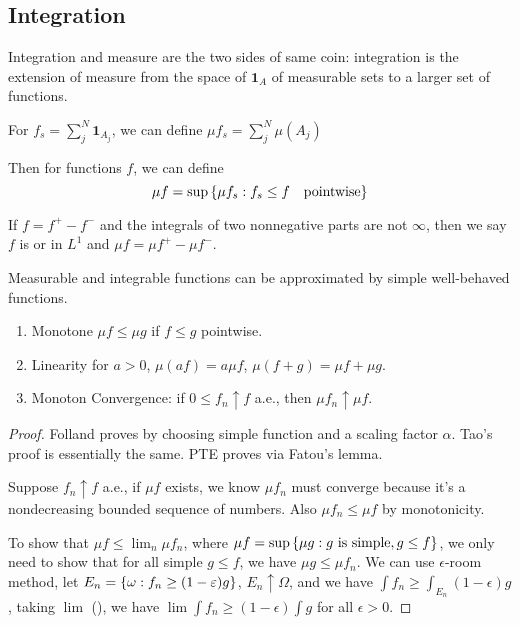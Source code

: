 \subsection{Integration}

Integration and measure are the two sides of same coin: integration is the extension of measure from the space of  \(\mathbf{1}_{A}\) of measurable sets to a larger set of functions. 

For  \(f_{s} = \sum^{N}_{j} \mathbf{1}_{A_{j}}\), we can define \(\mu f_{s} = \sum^{N}_{j} \mu(A_{j})\)


Then for  functions \(f\), we can define 
\begin{equation*}
    \mu f = \sup \Bqty{\mu f_{s} : f_{s} \leq f \quad \text{pointwise}}
\end{equation*}

If \(f = f^{+} - f^{-}\) and the integrals of two nonnegative parts are not \(\infty\), then we say \(f\) is  or in \({L}^{1}\) and \(\mu f = \mu f^{+} - \mu f^{-}\).  

\begin{thm}
    Measurable and integrable functions can be approximated by simple well-behaved functions.   
\end{thm}
\begin{thm}
    
\end{thm}
\begin{thm}
    \begin{enumerate}
        \item Monotone \(\mu f \leq \mu g\) if \(f \leq g\) pointwise.
        \item Linearity for \(a > 0\), \(\mu (af) = a \mu f\), \(\mu(f + g)=  \mu f + \mu g\).
        \item Monoton Convergence: if \(0 \leq f_{n} \uparrow f\) a.e., then \(\mu f_{n} \uparrow \mu f\). 
    \end{enumerate}
\end{thm}
\begin{proof}
    Folland proves by choosing simple function and a scaling factor \(\alpha\). Tao's proof is essentially the same.
    PTE proves via Fatou's lemma. 
    
    Suppose \(f_{n}\uparrow f\) a.e., if \(\mu f\) exists, we know \(\mu f_{n}\) must converge because it's a nondecreasing bounded sequence of numbers. Also \(\mu f_{n} \leq \mu f\) by monotonicity. 

    To show that \(\mu f \leq \lim_{n} \mu f_{n}\), where \(\mu f = \sup \Bqty{\mu g: g \text{ is simple}, g \leq f}\), we only need to show that for all simple \(g \leq f\), we have \(\mu g \leq \mu f_{n}\). We can use \(\epsilon\)-room method, let \(E_{n} = \Bqty{\omega: f_{n} \geq (1 - \epsilon) g}\), \(E_{n} \uparrow \Omega\), and we have \(\int f_{n} \geq \int_{E_{n}} (1 - \epsilon)g\), taking \(\lim\) (), we have \(\lim \int f_{n} \geq (1 - \epsilon) \int g\) for all \(\epsilon> 0\). 
\end{proof}


